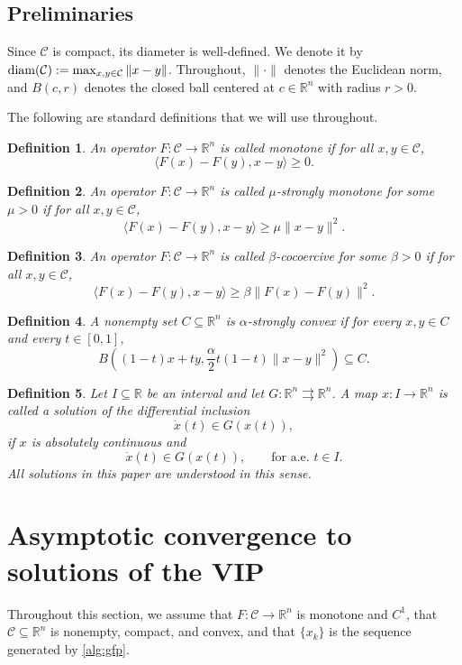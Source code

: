 \documentclass[pdflatex,sn-mathphys-num]{sn-jnl}%
\newcommand\diam{\mathop{\rm diam}}
\newcommand\R{\mathbb{R}}
\newcommand\C{\mathcal{C}}
\newcommand\dx{\dot{x}}
\theoremstyle{thmstyleone}%
\theoremstyle{thmstyletwo}%
\theoremstyle{thmstylethree}%
\newtheorem{definition}{Definition}%
\begin{document}
\subsection{Preliminaries}
Since $\C$ is compact, its diameter is well-defined. We denote it by $\diam(\C) := \max_{x,y \in \C} \|x-y\|$. Throughout,
$\|\cdot\|$ denotes the Euclidean norm, and $B(c,r)$ denotes the closed ball centered at $c \in \R^n$ with radius $r > 0$.

The following are standard definitions that we will use throughout.
\begin{definition}
  An operator $F : \C \to \R^n$ is called monotone if for all $x,y \in \C$,
  \[
    \langle{F(x) - F(y), x - y}\rangle \geq 0.
  \]
\end{definition}

\begin{definition}
  An operator $F : \C \to \R^n$ is called $\mu$-strongly monotone for some $\mu > 0$ if for all $x,y \in \C$,
  \[
    \langle{F(x) - F(y), x - y}\rangle \geq \mu\|x-y\|^2.
  \]
\end{definition}

\begin{definition}
  An operator $F : \C \to \R^n$ is called $\beta$-cocoercive for some $\beta > 0$ if for all $x,y \in \C$,
  \[
    \langle{F(x) - F(y), x - y}\rangle \geq \beta\|F(x) - F(y)\|^2.
  \]
\end{definition}

\begin{definition}
  A nonempty set $C \subseteq \R^n$ is $\alpha$-strongly convex if for every $x,y\in C$ and every $t \in [0,1]$,
  \[
    B\left((1-t)x + ty, \frac{\alpha}{2}t(1-t)\lVert x - y\rVert^2\right) \subseteq C.
  \]
\end{definition}

\begin{definition} \label{def:soln}
  Let $I \subseteq \R$ be an interval and let $G : \R^n \rightrightarrows \R^n$.
  A map $x : I \to \R^n$ is called a solution of the differential inclusion
  \[
    \dot x(t) \in G(x(t)),
  \]
  if $x$ is absolutely continuous and
  \[
    \dx(t) \in G(x(t)), \qquad \text{for a.e. } t \in I.
  \]
  All solutions in this paper are understood in this sense.
\end{definition}

\section{Asymptotic convergence to solutions of the VIP} \label{sec:hammond}
Throughout this section, we assume that $F:\C \to \R^n$ is monotone and $C^1$, that $\C\subseteq\R^n$ is nonempty, compact, and convex,
and that $\{x_k\}$ is the sequence generated by \eqref{alg:gfp}.
\end{document}
